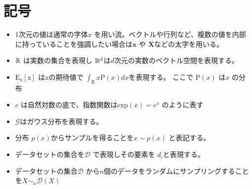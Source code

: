 \chapter*{記号}
\label{thanks}


\begin{itemize}
    \item 1次元の値は通常の字体$ x $ を用い流。ベクトルや行列など、複数の値を内部に持っていることを強調したい場合は$ \mathbf{x} $ や $ \mathbf{X} $などの太字を用いる。
    \item $\mathbb{R}$ は実数の集合を表現し $\mathbb{R}^d$は$ d $次元の実数のベクトル空間を表現する。 
    \item $\mathrm{E_x[x]}$ はxの期待値で $ \int_{\mathrm{R}} x \mathrm{P}(x) dx $を表現する。 ここで $ \mathrm{P}(x) $ は$ x $ の分布
    \item $e$ は自然対数の底で、指数関数は$\mathrm{exp}(x) = e^x$ のように表す
    \item $ \mathcal{G} $はガウス分布を表現する。
    \item 分布 $p(x)$からサンプルを得ることを$ x \sim p(x) $ と表記する。
    \item データセットの集合を$ \mathcal{D} $ で表現しその要素を $ d_i $と表現する。
    \item データセットの集合$ \mathcal{D} $ から$ n $個のデータをランダムにサンプリングすることを$ X \sim_n \mathcal{D}(X) $ 

\end{itemize}